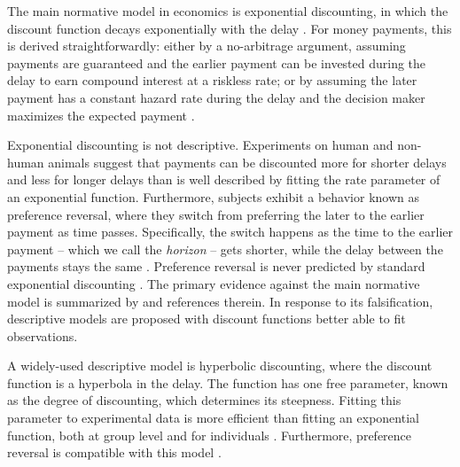 The main normative model in economics is exponential discounting, in which the discount function decays exponentially with the delay \citep{Samuelson1937}. For money payments, this is derived straightforwardly: either by a no-arbitrage argument, assuming payments are guaranteed and the earlier payment can be invested during the delay to earn compound interest at a riskless rate; or by assuming the later payment has a constant hazard rate %
during the delay and the decision maker maximizes the expected payment \citep{Kacelnik1997}.

Exponential discounting is not descriptive. Experiments on human and non-human animals suggest that payments can be discounted more for shorter delays and less for longer delays than is well described by fitting the rate parameter of an exponential function. Furthermore, subjects exhibit a behavior known as preference reversal, where they switch from preferring the later to the earlier payment as time passes. Specifically, the switch happens as the time to the earlier payment -- which we call the \textit{horizon} -- gets shorter, while the delay between the payments stays the same \citep[p.~288]{KerenRoelofsma1995}. Preference reversal is never predicted by standard exponential discounting \citep[Fig~2]{GreenMyerson1996}. The primary evidence against the main normative model is summarized by \citet{MyersonGreen1995} and references therein. In response to its falsification, descriptive models are proposed with discount functions better able to fit observations.

A widely-used descriptive model is hyperbolic discounting, where the discount function is a hyperbola in the delay. The function has one free parameter, known as the degree of discounting, which determines its steepness. Fitting this parameter to experimental data is more efficient than fitting an exponential function, both at group level and for individuals \citep{MyersonGreen1995}. Furthermore, preference reversal is compatible with this model \citep[Fig.~2]{GreenMyerson1996}.

